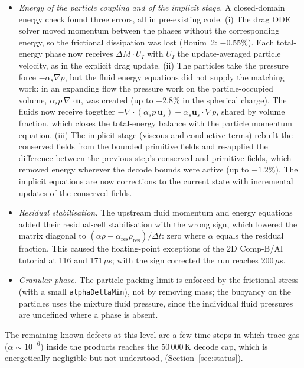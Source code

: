 \documentclass{article}
\begin{document}
\begin{itemize}
    \item \emph{Energy of the particle coupling and of the implicit stage.} A closed-domain energy check found three errors, all in pre-existing code. (i) The drag ODE solver moved momentum between the phases without the corresponding energy, so the frictional dissipation was lost (Houim~2: $-0.55\%$). Each total-energy phase now receives $\Delta M\cdot U_I$ with $U_I$ the update-averaged particle velocity, as in the explicit drag update. (ii) The particles take the pressure force $-\alpha_s\nabla p$, but the fluid energy equations did not supply the matching work: in an expanding flow the pressure work on the particle-occupied volume, $\alpha_s p\,\nabla\cdot\mathbf{u}$, was created (up to $+2.8\%$ in the spherical charge). The fluids now receive together $-\nabla\cdot(\alpha_s p\,\mathbf{u}_s) + \alpha_s\mathbf{u}_s\cdot\nabla p$, shared by volume fraction, which closes the total-energy balance with the particle momentum equation. (iii) The implicit stage (viscous and conductive terms) rebuilt the conserved fields from the bounded primitive fields and re-applied the difference between the previous step's conserved and primitive fields, which removed energy wherever the decode bounds were active (up to $-1.2\%$). The implicit equations are now corrections to the current state with incremental updates of the conserved fields.
    \item \emph{Residual stabilisation.} The upstream fluid momentum and energy equations added their residual-cell stabilisation with the wrong sign, which lowered the matrix diagonal to $(\alpha\rho - \alpha_\text{res}\rho_\text{res})/\Delta t$: zero where $\alpha$ equals the residual fraction. This caused the floating-point exceptions of the 2D Comp-B/Al tutorial at 116 and 171\,$\mu$s; with the sign corrected the run reaches 200\,$\mu$s.
    \item \emph{Granular phase.} The particle packing limit is enforced by the frictional stress (with a small \texttt{alphaDeltaMin}), not by removing mass; the buoyancy on the particles uses the mixture fluid pressure, since the individual fluid pressures are undefined where a phase is absent.
\end{itemize}

The remaining known defects at this level are a few time steps in which trace gas ($\alpha \sim 10^{-6}$) inside the products reaches the 50\,000\,K decode cap, which is energetically negligible but not understood, (Section~\ref{sec:status}).

\end{document}
